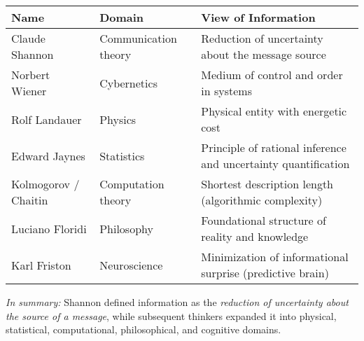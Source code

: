         \begin{center}
            \begin{tabular}{|l|l|p{8cm}|}
                \hline
                \textbf{Name}        & \textbf{Domain}      & \textbf{View of Information}                                   \\
                \hline
                Claude Shannon       & Communication theory & Reduction of uncertainty about the message source              \\
                Norbert Wiener       & Cybernetics          & Medium of control and order in systems                         \\
                Rolf Landauer        & Physics              & Physical entity with energetic cost                            \\
                Edward Jaynes        & Statistics           & Principle of rational inference and uncertainty quantification \\
                Kolmogorov / Chaitin & Computation theory   & Shortest description length (algorithmic complexity)           \\
                Luciano Floridi      & Philosophy           & Foundational structure of reality and knowledge                \\
                Karl Friston         & Neuroscience         & Minimization of informational surprise (predictive brain)      \\
                \hline
            \end{tabular}
        \end{center}
        
        \bigskip
        \textit{In summary:}
        Shannon defined information as the \emph{reduction of uncertainty about the source of a message},
        while subsequent thinkers expanded it into physical, statistical, computational, philosophical, and cognitive domains.
